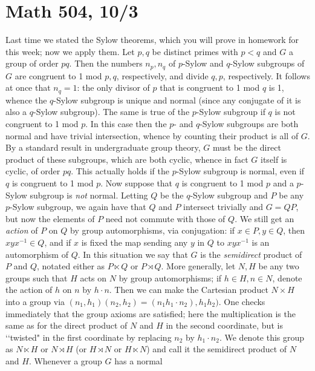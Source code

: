 \documentclass[10pt]{article}
\begin{document}
\section*{Math 504, 10/3}

Last time we stated the Sylow theorems, which you will prove in homework
for this week; now we apply them. Let $p,q$ be distinct primes with
$p<q$ and $G$ a group of order $pq$. Then the numbers $n_p,n_q$ of
$p$-Sylow and $q$-Sylow subgroups of $G$ are congruent to 1 mod $p,q$,
respectively, and divide $q,p$, respectively. It follows at once that
$n_q = 1$: the only divisor of $p$ that is congruent to 1 mod $q$ is 1,
whence the $q$-Sylow subgroup is unique and normal (since any conjugate
of it is also a $q$-Sylow subgroup). The same is true of the $p$-Sylow
subgroup if $q$ is not congruent to 1 mod $p$. In this case then the
$p$- and $q$-Sylow subgroups are both normal and have trivial
intersection, whence by counting their product is all of $G$. By a
standard result in undergraduate group theory, $G$ must be the direct
product of these subgroups, which are both cyclic, whence in fact $G$
itself is cyclic, of order $pq$. This actually holds if the $p$-Sylow
subgroup is normal, even if $q$ is congruent to 1 mod $p$. Now suppose
that $q$ is congruent to 1 mod $p$ and a $p$-Sylow subgroup is {\sl not}
normal. Letting $Q$ be the $q$-Sylow subgroup and $P$ be any $p$-Sylow
subgroup, we again have that $Q$ and $P$ intersect trivially and $G =
QP$, but now the elements of $P$ need not commute with those of $Q$. We
still get an {\sl action} of $P$ on $Q$ by group automorphisms, via
conjugation: if $x\in P,y\in Q$, then $xyx^{-1}\in Q$, and if $x$ is
fixed the map sending any $y$ in $Q$ to $xyx^{-1}$ is an automorphism of
$Q$. In this situation we say that $G$ is the {\sl semidirect} product
of $P$ and $Q$, notated either as $P\ltimes Q$ or $P\rtimes Q$. More
generally, let $N,H$ be any two groups such that $H$ acts on $N$ by
group automorphisms; if $h\in H,n\in N$, denote the action of $h$ on $n$
by $h\cdot n$. Then we can make the Cartesian product $N\times H$ into a
group via $(n_1,h_1) (n_2,h_2) = (n_1 h_1\cdot n_2),h_1 h_2)$. One
checks immediately that the group axioms are satisfied; here the
multiplication is the same as for the direct product of $N$ and $H$ in
the second coordinate, but is \lq\lq twisted" in the first coordinate by
replacing $n_2$ by $h_1\cdot n_2$. We denote this group as $N\ltimes H$
or $N\rtimes H$ (or $H\rtimes N$ or $H\ltimes N$) and call it the
semidirect product of $N$ and $H$. Whenever a group $G$ has a normal
\end{document}

